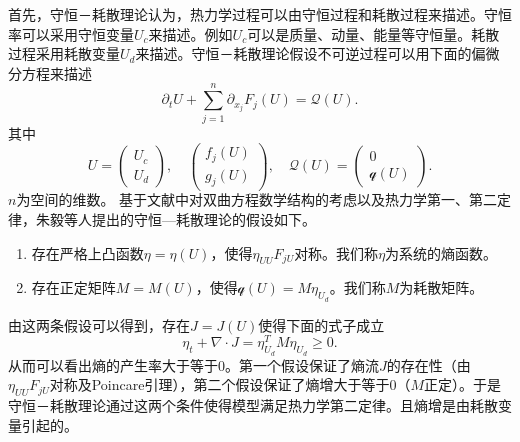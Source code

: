 	首先，守恒－耗散理论认为，热力学过程可以由守恒过程和耗散过程来描述。守恒率可以采用守恒变量$U_c$来描述。例如$U_c$可以是质量、动量、能量等守恒量。耗散过程采用耗散变量$U_d$来描述。守恒－耗散理论假设不可逆过程可以用下面的偏微分方程来描述
	\begin{equation}\label{eq:CDF}
		\partial_t U + \sum_{j=1}^n \partial_{x_j} F_j(U) = \mathcal{Q} (U) .
	\end{equation}
	其中
	\begin{equation*}
		U = \left( \begin{array}{c}
			U_c \\ U_d 
			\end{array} \right) , \quad
			 \left( \begin{array}{c}
			f_j(U) \\ g_j(U)
			\end{array} \right), \quad 
			\mathcal{Q}(U) = \left( \begin{array}{c}
			0 \\ \mathcal{q} (U) 
			\end{array} \right).
	\end{equation*}
	$n$为空间的维数。
	基于文献\cite{yong1999singular,yang2015validity,yong2008interesting}中对双曲方程数学结构的考虑以及热力学第一、第二定律，朱毅等人提出的守恒—耗散理论的假设如下\cite{zhu2014conservation}。
	\begin{enumerate}
		\item 存在严格上凸函数$\eta = \eta (U)$，使得$\eta_{UU} F_{jU}$对称。我们称$\eta$为系统的熵函数。
		\item 存在正定矩阵$M = M(U)$，使得$\mathcal{q}(U) = M \eta_{U_d}$。我们称$M$为耗散矩阵。
	\end{enumerate}
	由这两条假设可以得到，存在$J = J(U)$使得下面的式子成立
	\begin{equation*}
		\eta_t + \nabla \cdot J = \eta_{U_d}^T M \eta_{U_d} \ge 0.
	\end{equation*}
	从而可以看出熵的产生率大于等于0。第一个假设保证了熵流$J$的存在性（由$\eta_{UU} F_{jU}$对称及Poincare引理），第二个假设保证了熵增大于等于0（$M$正定）。于是守恒－耗散理论通过这两个条件使得模型满足热力学第二定律。且熵增是由耗散变量引起的\cite{zhu2014conservation}。
	
